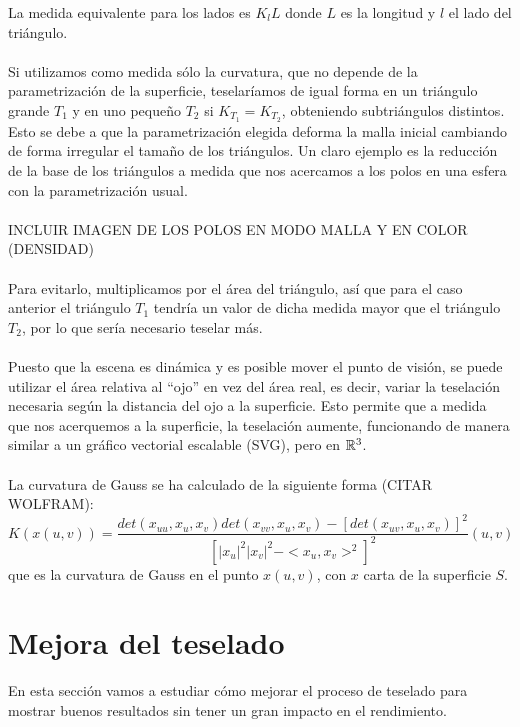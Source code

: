 	La medida equivalente para los lados es $K_l L$ donde $L$ es la longitud y $l$ el lado del triángulo.\\
	\\Si utilizamos como medida sólo la curvatura, que no depende de la parametrización de la superficie, teselaríamos de igual forma en un triángulo grande $T_1$ y en uno pequeño $T_2$ si $K_{T_1}=K_{T_2}$, obteniendo subtriángulos distintos. Esto se debe a que la parametrización elegida deforma la malla inicial cambiando de forma irregular el tamaño de los triángulos. Un claro ejemplo es la reducción de la base de los triángulos a medida que nos acercamos a los polos en una esfera con la parametrización usual.\\
	\\INCLUIR IMAGEN DE LOS POLOS EN MODO MALLA Y  EN COLOR (DENSIDAD)\\
	\\Para evitarlo, multiplicamos por el área del triángulo, así que para el caso anterior el triángulo $T_1$ tendría un valor de dicha medida mayor que el triángulo $T_2$, por lo que sería necesario teselar más.\\
	\\Puesto que la escena es dinámica y es posible mover el punto de visión, se puede utilizar el área relativa al ``ojo'' en vez del área real, es decir, variar la teselación necesaria según la distancia del ojo a la superficie. Esto permite que a medida que nos acerquemos a la superficie, la teselación aumente, funcionando de manera similar a un gráfico vectorial escalable (SVG), pero en $\mathbb{R}^3$.\\
	\\La curvatura de Gauss se ha calculado de la siguiente forma (CITAR WOLFRAM):
		$$K(x(u,v)) = \frac{det(x_{uu}, x_u, x_v) det(x_{vv}, x_u, x_v) - [det(x_{uv}, x_u, x_v)]^2} {[|x_u|^2|x_v|^2 - <x_u, x_v>^2]^2} (u, v)$$
	que es la curvatura de Gauss en el punto $x(u, v)$, con $x$ carta de la superficie $S$.
	
	
\section{Mejora del teselado}
	En esta sección vamos a estudiar cómo mejorar el proceso de teselado para mostrar buenos resultados sin tener un gran impacto en el rendimiento.
	
